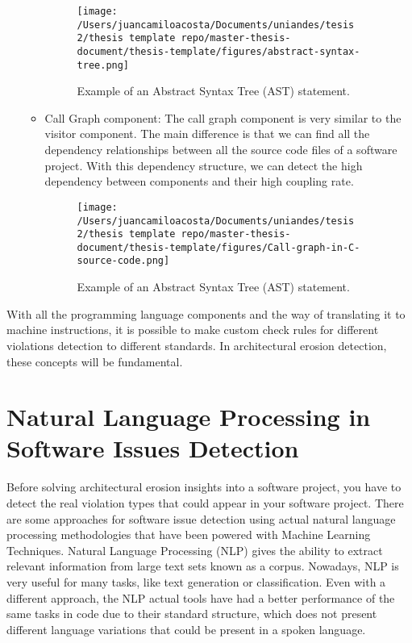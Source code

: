 \begin{itemize}
\begin{itemize}
\begin{figure}
    				\centering
    				\texttt{[image: /Users/juancamiloacosta/Documents/uniandes/tesis 2/thesis template repo/master-thesis-document/thesis-template/figures/abstract-syntax-tree.png]}
   				 \caption{Example of an Abstract Syntax Tree (AST) statement. \citet{} }
   				 \label{fig:ast}
			\end{figure}
			\item Call Graph component: The call graph component is very similar to the visitor component. The main difference is that we can find all the dependency relationships between all the source code files of a software project. With this dependency structure, we can detect the high dependency between components and their high coupling rate.
			\begin{figure}
    				\centering
    				\texttt{[image: /Users/juancamiloacosta/Documents/uniandes/tesis 2/thesis template repo/master-thesis-document/thesis-template/figures/Call-graph-in-C-source-code.png]}
   				 \caption{Example of an Abstract Syntax Tree (AST) statement. \citet{} }
   				 \label{fig:ast}
			\end{figure}
		\end{itemize}
\end{itemize}

With all the programming language components and the way of translating it to machine instructions, it is possible to make custom check rules for different violations detection to different standards. In architectural erosion detection, these concepts will be fundamental.

\section{Natural Language Processing in Software Issues Detection}
Before solving architectural erosion insights into a software project, you have to detect the real violation types that could appear in your software project. There are some approaches for software issue detection using actual natural language processing methodologies that have been powered with Machine Learning Techniques. Natural Language Processing (NLP) gives the ability to extract relevant information from large text sets known as a corpus. Nowadays, NLP is very useful for many tasks, like text generation or classification. Even with a different approach, the NLP actual tools have had a better performance of the same tasks in code due to their standard structure, which does not present different language variations that could be present in a spoken language.

